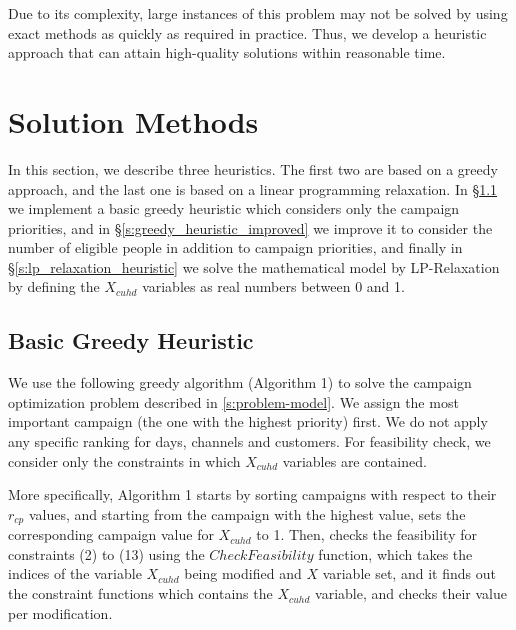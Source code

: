 \documentclass[11pt]{article}
\begin{document}
Due to its complexity, large instances of this problem may not be solved by using exact methods as quickly as required in practice. Thus, we develop a heuristic approach that can attain high-quality solutions within reasonable time.


\section{Solution Methods}  \label{s:solution-method}

In this section, we describe three heuristics. The first two are based on a greedy approach, and the last one is based on a linear programming relaxation. In \S \ref{s:greedy_heuristic_basic} we implement a basic greedy heuristic which considers only the campaign priorities, and in \S \ref{s:greedy_heuristic_improved} we improve it to consider the number of eligible people in addition to campaign priorities, and finally in \S \ref{s:lp_relaxation_heuristic} we solve the mathematical model by LP-Relaxation by defining the  $X_{{c}{u}{h}{d}}$ variables as real numbers between 0 and 1.

\subsection{Basic Greedy Heuristic} \label{s:greedy_heuristic_basic}

We use the following greedy algorithm (Algorithm 1) to solve the campaign optimization problem described in \ref{s:problem-model}. We assign  the most important campaign (the one with the highest priority) first. We do not apply any specific ranking for days, channels and customers. For feasibility check, we consider only the constraints in which $X_{{c}{u}{h}{d}}$ variables are contained.

More specifically, Algorithm 1 starts by sorting campaigns with respect to their $r_{cp}$ values, and starting from the campaign with the highest value, sets the corresponding campaign value for $X_{cuhd}$ to 1. Then, checks the feasibility for constraints (2) to (13) using the $CheckFeasibility$ function, which takes the indices of the variable $X_{cuhd}$ being modified and $X$ variable set, and it finds out the constraint functions which contains the $X_{cuhd}$ variable, and checks their value per modification.
\\
\end{document}
